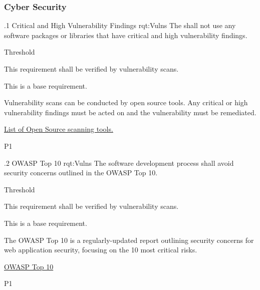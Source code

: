\subsubsection{Cyber Security}
\label{sssec_Cyber_Security}

\ONERQMTV
{\RqtNumberBase.1}
{Critical and High Vulnerability Findings}
{rqt:Vulns}
{The \ThisSystem shall not use any software packages or libraries that have critical and high vulnerability findings.}
{
	\item [All Phases] Threshold
}
{This requirement shall be verified by vulnerability scans.}
{
\item [N/A] This is a base requirement.
}
{
	\item Vulnerability scans can be conducted by open source tools. Any critical or high vulnerability findings must be acted on and the vulnerability must be remediated.
	\item \href{https://owasp.org/www-community/Vulnerability_Scanning_Tools}{List of Open Source scanning tools.}
}
{P1}

\ONERQMTV
{\RqtNumberBase.2}
{OWASP Top 10}
{rqt:Vulns}
{The \ThisSystem software development process shall avoid security concerns outlined in the OWASP Top 10.}
{
	\item [All Phases] Threshold
}
{This requirement shall be verified by vulnerability scans.}
{
\item [N/A] This is a base requirement.
}
{
	\item The OWASP Top 10 is a regularly-updated report outlining security concerns for web application security, focusing on the 10 most critical risks.
	\item \href{https://owasp.org/www-project-top-ten/}{OWASP Top 10}
}
{P1}
